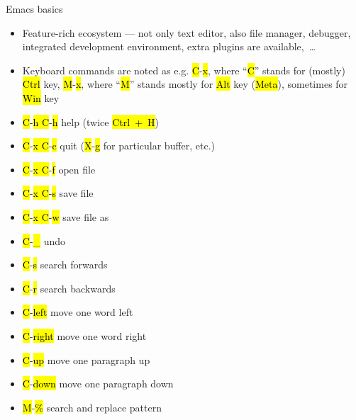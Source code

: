 \documentclass[compress, ucs, xelatex, 11pt, xcolor=svgnames, aspectratio=169,
	hyperref={
		bookmarks=true,
		unicode=true,
		colorlinks=true,
		pdftitle={Linux, command line and MetaCentrum},
		plainpages=false,
		pdfauthor={Vojtech Zeisek},
		pdfsubject={Course about use of Linux command line, writing shell scripts and using MetaCentrum of CESNET},
		pdfcreator={XeLaTeX},
		pdfkeywords={Linux, GNU, BASH, shell, command line, MetaCentrum},
		linkcolor=DarkRed, %
		anchorcolor=DarkBlue, %
		citecolor=Indigo, %
		filecolor=NavyBlue, %
		menucolor=DarkMagenta, %
		urlcolor=DarkBlue, %
		pdftex},
	url={hyphens, lowtilde} %
	]{beamer}
\renewcommand{\texttt}[1]{\hl{\ttfamily #1}}
\begin{document}
\begin{frame}{Emacs basics}
	\begin{itemize}
		\item Feature-rich ecosystem --- not only text editor, also file manager, debugger, integrated development environment, extra plugins are available,~\ldots
		\item Keyboard commands are noted as e.g. \texttt{C}-\texttt{x}, where \enquote{\texttt{C}} stands for (mostly) \texttt{Ctrl} key, \texttt{M}-\texttt{x}, where \enquote{\texttt{M}} stands mostly for \texttt{Alt} key (\texttt{Meta}), sometimes for \texttt{Win} key
	\end{itemize}
	\begin{multicols}{2}
		\begin{itemize}
			\item \texttt{C}-\texttt{h C}-\texttt{h} help (twice \texttt{Ctrl~+~H})
			\item \texttt{C}-\texttt{x C}-\texttt{c} quit (\texttt{X}-\texttt{g} for particular buffer, etc.)
			\item \texttt{C}-\texttt{x C}-\texttt{f} open file
			\item \texttt{C}-\texttt{x C}-\texttt{s} save file
			\item \texttt{C}-\texttt{x C}-\texttt{w} save file as
			\item \texttt{C}-\texttt{\_} undo
			\item \texttt{C}-\texttt{s} search forwards
			\item \texttt{C}-\texttt{r} search backwards
			\item \texttt{C}-\texttt{left} move one word left
			\item \texttt{C}-\texttt{right} move one word right
			\item \texttt{C}-\texttt{up} move one paragraph up
			\item \texttt{C}-\texttt{down} move one paragraph down
			\item \texttt{M}-\texttt{\%} search and replace pattern
		\end{itemize}
	\end{multicols}
\end{frame}
\end{document}
